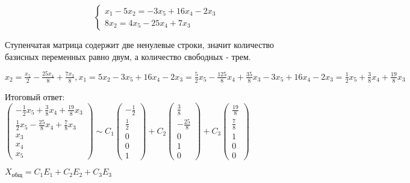 \documentclass{article}
\begin{document}
\begin{flushleft}
\hfill

\begin{equation}
    \begin{cases}
        x_1 - 5x_2 = -3x_5 + 16x_4 - 2x_3 \\ 
        8x_2 = 4x_5 - 25x_4 + 7x_3
    \end{cases}
\end{equation}

Ступенчатая матрица содержит две ненулевые строки, значит количество базисных переменных равно двум, а количество свободных - трем.

\hfill

$x_2 = \frac{x_5}{2} - \frac{25x_4}{8} + \frac{7x_3}{8}, x_1 = 5x_2 - 3x_5 + 16x_4 - 2x_3 = \frac{5}{2}x_5 - \frac{125}{8}x_4 + \frac{35}{8}x_3 - 3x_5 + 16x_4 - 2x_3 = \frac{1}{2}x_5 + \frac{3}{8}x_4 + \frac{19}{8}x_3$

\hfill

Итоговый ответ: $\begin{pmatrix}
    -\frac{1}{2}x_5 + \frac{3}{8}x_4 + \frac{19}{8}x_3 \\
    \frac{1}{2}x_5 - \frac{25}{8}x_4 + \frac{7}{8}x_3 \\
    x_3 \\
    x_4 \\
    x_5
\end{pmatrix} \sim C_1 \begin{pmatrix}
    -\frac{1}{2} \\
    \frac{1}{2} \\
    0 \\
    0 \\
    1
\end{pmatrix} + C_2 \begin{pmatrix}
    \frac{3}{8} \\
    -\frac{25}{8} \\
    0 \\
    1 \\
    0
\end{pmatrix} + C_3 \begin{pmatrix}
    \frac{19}{8} \\
    \frac{7}{8} \\
    1 \\
    0 \\
    0
\end{pmatrix}$

\hfill

$X_{\text{общ}} = C_1 E_1 + C_2E_2 + C_3E_3$

\hfill


\end{flushleft}
\end{document}
